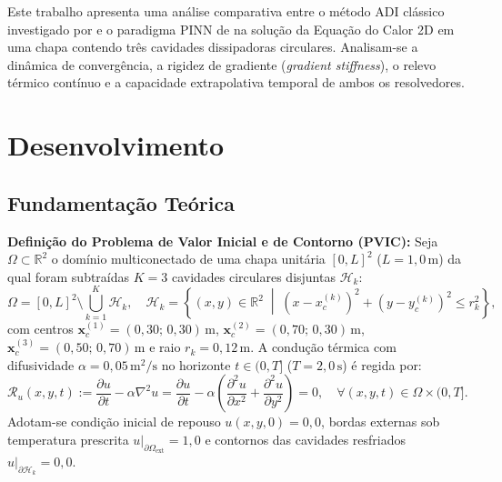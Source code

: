 \documentclass[a4paper, 12pt, twoside]{article}
\begin{document}
Este trabalho apresenta uma análise comparativa entre o método ADI clássico investigado por \textcite{pereira2019} e o paradigma PINN de \textcite{raissi2019pinns} na solução da Equação do Calor 2D em uma chapa contendo três cavidades dissipadoras circulares. Analisam-se a dinâmica de convergência, a rigidez de gradiente (\textit{gradient stiffness}), o relevo térmico contínuo e a capacidade extrapolativa temporal de ambos os resolvedores.

\section{Desenvolvimento}

\subsection{Fundamentação Teórica}

\textbf{Definição do Problema de Valor Inicial e de Contorno (PVIC):} Seja $\Omega \subset \mathbb{R}^2$ o domínio multiconectado de uma chapa unitária $[0, L]^2$ ($L=1{,}0\,\text{m}$) da qual foram subtraídas $K=3$ cavidades circulares disjuntas $\mathcal{H}_k$:
\begin{equation}
    \Omega = [0, L]^2 \setminus \bigcup_{k=1}^K \mathcal{H}_k, \quad \mathcal{H}_k = \left\{(x, y) \in \mathbb{R}^2 \;\middle|\; (x - x_c^{(k)})^2 + (y - y_c^{(k)})^2 \le r_k^2\right\},
\end{equation}
com centros $\mathbf{x}_c^{(1)} = (0{,}30;\, 0{,}30)\,\text{m}$, $\mathbf{x}_c^{(2)} = (0{,}70;\, 0{,}30)\,\text{m}$, $\mathbf{x}_c^{(3)} = (0{,}50;\, 0{,}70)\,\text{m}$ e raio $r_k = 0{,}12\,\text{m}$. A condução térmica com difusividade $\alpha = 0{,}05\,\text{m}^2/\text{s}$ no horizonte $t \in (0, T]$ ($T = 2{,}0\,\text{s}$) é regida por:
\begin{equation}
    \mathcal{R}_u(x, y, t) := \frac{\partial u}{\partial t} - \alpha \nabla^2 u = \frac{\partial u}{\partial t} - \alpha \left( \frac{\partial^2 u}{\partial x^2} + \frac{\partial^2 u}{\partial y^2} \right) = 0, \quad \forall (x, y, t) \in \Omega \times (0, T]. \label{eq:heat}
\end{equation}
Adotam-se condição inicial de repouso $u(x, y, 0) = 0{,}0$, bordas externas sob temperatura prescrita $u|_{\partial\Omega_{\mathrm{ext}}} = 1{,}0$ e contornos das cavidades resfriados $u|_{\partial\mathcal{H}_k} = 0{,}0$.
\end{document}
